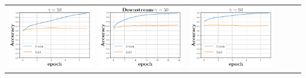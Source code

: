 \begin{minipage}{0.99\columnwidth}
{\begin{tabular}{cccccc}
\includegraphics[scale=0.125]{figs/galu_50_bad_good.pdf}&
\includegraphics[scale=0.125]{figs/relu_50_good.pdf}&
\includegraphics[scale=0.125]{figs/galu_50_recovered.pdf}

\end{tabular}}
\end{minipage}
